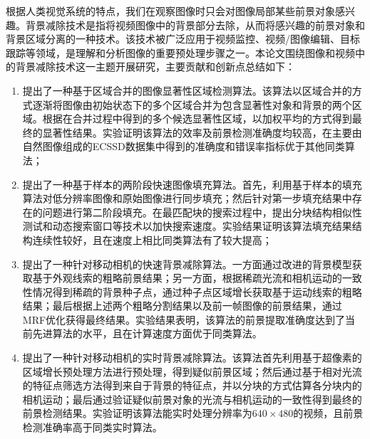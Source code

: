 \begin{cabstract}
根据人类视觉系统的特点，我们在观察图像时只会对图像局部某些前景对象感兴趣。背景减除技术是指将视频图像中的背景部分去除，从而将感兴趣的前景对象和背景区域分离的一种技术。该技术被广泛应用于视频监控、视频/图像编辑、目标跟踪等领域，是理解和分析图像的重要预处理步骤之一。本论文围绕图像和视频中的背景减除技术这一主题开展研究，主要贡献和创新点总结如下：
\begin{enumerate}
  \item 提出了一种基于区域合并的图像显著性区域检测算法。该算法以区域合并的方式逐渐将图像由初始状态下的多个区域合并为包含显著性对象和背景的两个区域。根据在合并过程中得到的多个候选显著性区域，以加权平均的方式得到最终的显著性结果。实验证明该算法的效率及前景检测准确度均较高，在主要由自然图像组成的ECSSD数据集中得到的准确度和错误率指标优于其他同类算法；

  \item 提出了一种基于样本的两阶段快速图像填充算法。首先，利用基于样本的填充算法对低分辨率图像和原始图像进行同步填充；然后针对第一步填充结果中存在的问题进行第二阶段填充。在最匹配块的搜索过程中，提出分块结构相似性测试和动态搜索窗口等技术以加快搜索速度。实验结果证明该算法填充结果结构连续性较好，且在速度上相比同类算法有了较大提高；
  \item 提出了一种针对移动相机的快速背景减除算法。一方面通过改进的背景模型获取基于外观线索的粗略前景结果；另一方面，根据稀疏光流和相机运动的一致性情况得到稀疏的背景种子点，通过种子点区域增长获取基于运动线索的粗略结果；最后根据上述两个粗略分割结果以及前一帧图像的前景结果，通过MRF优化获得最终结果。实验结果表明，该算法的前景提取准确度达到了当前先进算法的水平，且在计算速度方面优于同类算法。
  \item 提出了一种针对移动相机的实时背景减除算法。该算法首先利用基于超像素的区域增长预处理方法进行预处理，得到疑似前景区域；然后通过基于相对光流的特征点筛选方法得到来自于背景的特征点，并以分块的方式估算各分块内的相机运动；最后通过验证疑似前景对象的光流与相机运动的一致性得到最终的前景检测结果。实验证明该算法能实时处理分辨率为$640 \times 480$的视频，且前景检测准确率高于同类实时算法。
\end{enumerate}

\end{cabstract}


